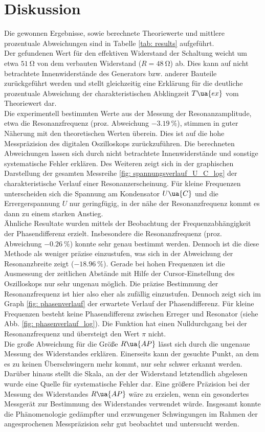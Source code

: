 \section{Diskussion}
Die gewonnen Ergebnisse, sowie berechnete Theoriewerte und mittlere prozentuale Abweichungen sind in Tabelle \ref{tab: results} aufgeführt. \\
Der gefundenen Wert für den effektiven Widerstand der Schaltung weicht um etwa $\SI{51}{\ohm}$ von dem verbauten Widerstand ($R =  \SI{48}{\ohm}$) ab. Dies kann
auf nicht betrachtete Innenwiderstände des Generators bzw. anderer Bauteile zurückgeführt werden und stellt
gleichzeitig eine Erklärung für die deutliche prozentuale Abweichung der charakteristischen Abklingzeit $T\ua{ex}$ vom Theoriewert dar.\\
Die experimentell bestimmten Werte aus der Messung der Resonanzamplitude, etwa die Resonanzfrequenz (proz. Abweichung $\SI{-3.19}{\percent}$),
stimmen in guter Näherung mit den theoretischen Werten überein. Dies ist auf die hohe Messpräzision des digitalen Oszilloskops zurückzuführen.
Die berechneten Abweichungen lassen sich durch nicht betrachtete Innenwiderstände und sonstige systematische Fehler erklären. Des Weiteren zeigt
sich in der graphischen Darstellung der gesamten Messreihe \ref{fig: spannungsverlauf_U_C_log} der charakteristische Verlauf einer Resonanzerscheinung.
Für kleine Frequenzen unterscheiden sich die Spannung am Kondensator $U\ua{C}$ und die Errergerspannung $U$ nur geringfügig, in der nähe
der Resonanzfrequenz kommt es dann zu einem starken Anstieg.\\
Ähnliche Resultate wurden mittels der Beobachtung der Frequenzabhängigkeit der Phasendifferenz erzielt.
Insbesondere die Resonanzfrequenz (proz. Abweichung $\SI{-0.26}{\percent}$) konnte
sehr genau bestimmt werden. Dennoch ist die diese Methode als weniger präzise einzustufen, was sich in der Abweichung der Resonanzbreite
zeigt ($\SI{-18.96}{\percent}$). Gerade bei hohen Frequenzen ist die Ausmessung der zeitlichen Abstände mit Hilfe der Cursor-Einstellung des Oszilloskops
nur sehr ungenau möglich. Die präzise Bestimmung der Resonanzfrequenz ist hier also eher als zufällig einzustufen. Dennoch zeigt sich im Graph \ref{fig: phasenverlauf}
der erwartete Verlauf der Phasendifferenz. Für kleine Frequenzen besteht keine Phasendifferenz zwischen Erreger und Resonator (siehe Abb. \ref{fig: phasenverlauf_log}).
Die Funktion hat einen Nulldurchgang bei der Resonanzfrequenz und übersteigt den Wert $\pi$ nicht.\\
Die große Abweichung für die Größe $R\ua{AP}$ lässt sich durch die ungenaue Messung des Widerstandes erklären. Einerseits kann der gesuchte Punkt,
an dem es zu keinen Überschwingern mehr kommt, nur sehr schwer erkannt werden. Darüber hinaus stellt die Skala, an der der Widerstand
letztendlich abgelesen wurde eine Quelle für systematische Fehler dar. Eine größere Präzision bei der Messung des Widerstandes $R\ua{AP}$ wäre zu erzielen,
wenn ein gesondertes Messgerät zur Bestimmung des Widerstandes verwendet würde.
Insgesamt konnte die Phänomenologie gedämpfter und erzwungener Schwingungen im Rahmen der angesprochenen Messpräzision sehr gut beobachtet und untersucht werden.

